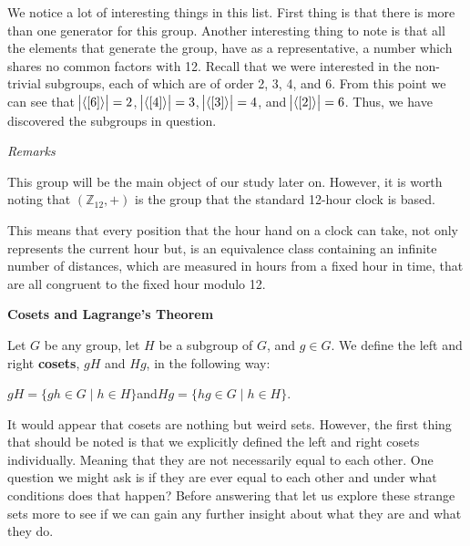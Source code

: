 \documentclass[12pt, a4paper]{article}
\begin{document}
    We notice a lot of interesting things in this list. First thing is that there is more than one generator for this group. Another interesting thing to note is that all the elements that generate the group, have as a representative, a number which shares no common factors with 12. Recall that we were interested in the non-trivial subgroups, each of which are of order 2, 3, 4, and 6. From this point we can see that $\abs{\langle [6]\rangle}=2$, $\abs{\langle [4]\rangle}=3$, $\abs{\langle [3]\rangle}=4$, and $\abs{\langle [2]\rangle}=6$. Thus, we have discovered the subgroups in question.
    
    
\begin{flushleft}

        \large{\textit{Remarks}}\normalsize\par
        
\vspace{4mm}
        This group will be the main object of our study later on. However, it is worth noting that $(\mathbb{Z}_{12},+)$ is the group that the standard 12-hour clock is based.

\end{flushleft}

 This means that every position that the hour hand on a clock can take, not only represents the current hour but, is an equivalence class containing an infinite number of distances, which are measured in hours from a fixed hour in time, that are all congruent to the fixed hour modulo 12.

\begin{flushleft}

    \textbf{\large{Cosets and Lagrange's Theorem}}\normalsize
    
\end{flushleft}

    Let $G$ be any group, let $H$ be a subgroup of $G$, and $g\in G$. We define the left and right \textbf{cosets}, $gH$ and $Hg$, in the following way:\par
    
\vspace{4mm}

        \centerline{$gH=\{gh\in G\mid h\in H\}$\hspace{5mm}and\hspace{5mm}$Hg=\{hg\in G\mid h\in H\}$.}
        
\vspace{4mm}

    It would appear that cosets are nothing but weird sets. However, the first thing that should be noted is that we explicitly defined the left and right cosets individually. Meaning that they are not necessarily equal to each other. One question we might ask is if they are ever equal to each other and under what conditions does that happen? Before answering that let us explore these strange sets more to see if we can gain any further insight about what they are and what they do.\par
    
\end{document}
